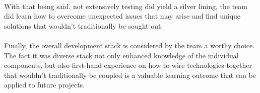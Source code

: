 \paragraph{}
With that being said, not extensively testing did yield a silver lining, the team did learn how to overcome unexpected issues that may arise and find unique solutions that wouldn't traditionally be sought out.

\paragraph{}
Finally, the overall development stack is considered by the team a worthy choice. The fact it was diverse stack not only enhanced knowledge of the individual components, but also first-hand experience on how to wire technologies together that wouldn't traditionally be coupled is a valuable learning outcome that can be applied to future projects. 

